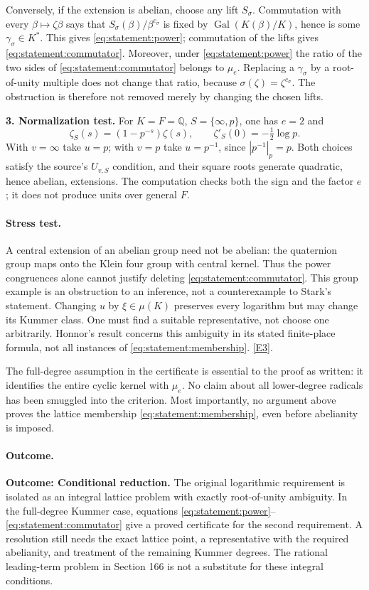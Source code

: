 \documentclass[11pt,a4paper]{article}
\newcommand{\Q}{\mathbb{Q}}
\newcommand{\eref}[2]{\hyperlink{extra:#1:#2}{[E#2]}}
\numberwithin{equation}{section}
\begin{document}
Conversely, if the extension is abelian, choose any lift $S_\sigma$.
Commutation with every $\beta\mapsto\zeta\beta$ says that
$S_\sigma(\beta)/\beta^{c_\sigma}$ is fixed by
$\operatorname{Gal}(K(\beta)/K)$, hence is some
$\gamma_\sigma\in K^*$. This gives \eqref{eq:statement:power}; commutation
of the lifts gives \eqref{eq:statement:commutator}. Moreover, under
\eqref{eq:statement:power} the ratio of the two sides of
\eqref{eq:statement:commutator} belongs to $\mu_e$. Replacing a
$\gamma_\sigma$ by a root-of-unity multiple does not change that
ratio, because $\sigma(\zeta)=\zeta^{c_\sigma}$. The obstruction is
therefore not removed merely by changing the chosen lifts.

\textbf{3. Normalization test.}
For $K=F=\Q$, $S=\{\infty,p\}$, one has $e=2$ and
\[
 \zeta_S(s)=(1-p^{-s})\zeta(s),\qquad
                  \zeta'_S(0)=-\tfrac12\log p.
\]
With $v=\infty$ take $u=p$; with $v=p$ take $u=p^{-1}$, since
$|p^{-1}|_p=p$. Both choices satisfy the source's $U_{v,S}$ condition,
and their square roots generate quadratic, hence abelian, extensions.
The computation checks both the sign and the factor $e$; it does not
produce units over general $F$.

\paragraph{Stress test.}
A central extension of an abelian group need not be abelian: the quaternion
group maps onto the Klein four group with central kernel. Thus the
power congruences alone cannot justify deleting
\eqref{eq:statement:commutator}. This group example is an obstruction to an
inference, not a counterexample to Stark's statement. Changing $u$ by
$\xi\in\mu(K)$ preserves every logarithm but may change its Kummer
class. One must find a suitable representative, not choose one
arbitrarily. Honnor's result concerns this ambiguity in its stated
finite-place formula, not all instances of \eqref{eq:statement:membership}.
\eref{statement}{3}.

The full-degree assumption in the certificate is essential to the proof
as written: it identifies the entire cyclic kernel with $\mu_e$.
No claim about all lower-degree radicals has been smuggled into the
criterion. Most importantly, no argument above proves the lattice
membership \eqref{eq:statement:membership}, even before abelianity is imposed.

\paragraph{Outcome.}
\textbf{Outcome: Conditional reduction.}
The original logarithmic requirement is isolated as an integral lattice
problem with exactly root-of-unity ambiguity. In the full-degree Kummer
case, equations \eqref{eq:statement:power}--\eqref{eq:statement:commutator} give a
proved certificate for the second requirement. A resolution still needs
the exact lattice point, a representative with the required abelianity,
and treatment of the remaining Kummer degrees. The rational leading-term
problem in Section 166 is not a substitute for these integral conditions.
\end{document}
